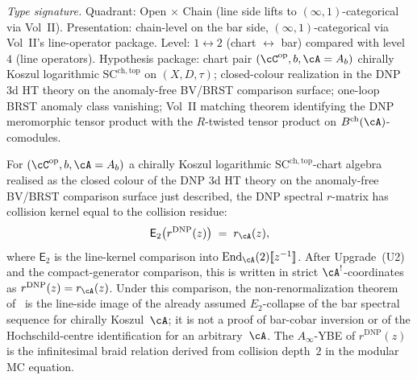 \begin{theorem}
\label{thm:hdm-face-2}
\emph{Type signature.} Quadrant: Open $\times$ Chain (line side
lifts to $(\infty,1)$-categorical via Vol~II). Presentation:
chain-level on the bar side, $(\infty,1)$-categorical via Vol~II's
line-operator package. Level: $1\leftrightarrow 2$ (chart
$\leftrightarrow$ bar) compared with level~$4$ (line operators).
Hypothesis package: chart pair
$(\cC^{\mathrm{op}}, b, \cA = A_b)$ chirally Koszul logarithmic
$\mathrm{SC}^{\mathrm{ch,top}}$ on $(X,D,\tau)$; closed-colour
realization in the DNP 3d HT theory on the anomaly-free BV/BRST
comparison surface; one-loop BRST anomaly class vanishing; Vol~II
matching theorem identifying the DNP meromorphic tensor product
with the $R$-twisted tensor product on $B^{\mathrm{ch}}(\cA)$-comodules.

For $(\cC^{\mathrm{op}}, b, \cA = A_b)$ a chirally Koszul logarithmic
$\mathrm{SC}^{\mathrm{ch,top}}$-chart algebra realised as the closed
colour of the DNP 3d HT theory on the anomaly-free BV/BRST comparison
surface just described, the DNP spectral $r$-matrix has collision
kernel equal to the collision residue:
\begin{equation}\label{eq:hdm-face-2}
\mathsf E_2\bigl(r^{\mathrm{DNP}}(z)\bigr) \;=\; r_\cA(z),
\end{equation}
where $\mathsf E_2$ is the line-kernel comparison into
$\mathrm{End}_\cA(2)[\![z^{-1}]\!]$. After Upgrade~\textup{(U2)} and
the compact-generator comparison, this is written in strict
$\cA^!$-coordinates as $r^{\mathrm{DNP}}(z)=r_\cA(z)$.
Under this comparison, the non-renormalization theorem
of~\textup{\cite{DNP25}} is the line-side image of the already assumed
$E_2$-collapse of the bar spectral sequence for chirally Koszul~$\cA$;
it is not a proof of bar-cobar inversion or of the Hochschild-centre
identification for an arbitrary~$\cA$. The $A_\infty$-YBE of
$r^{\mathrm{DNP}}(z)$ is the
infinitesimal braid relation derived from collision depth~$2$ in the
modular MC equation.
\end{theorem}

